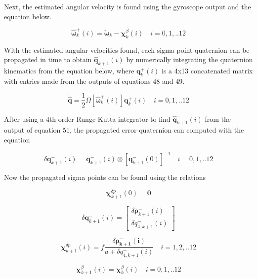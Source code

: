 \documentclass[12pt]{report}
\begin{document}
\noindent Next, the estimated angular velocity is found using the gyroscope output and the equation below.

\begin{equation}
	\pmb{\hat{\omega}}_k^+(i)  = \tilde{\pmb{\omega}}_k - \pmb{\chi}_k^{\beta}(i) \quad i = 0,1,..12
\end{equation} 

\noindent With the estimated angular velocities found, each sigma point quaternion can be propagated in time to obtain $\hat{\pmb{q}}_{k+1}^-(i)$ by numerically integrating the quaternion kinematics from the equation below, where $\pmb{q}_k^+(i)$ is a 4x13 concatenated matrix with entries made from the outputs of equations 48 and 49.

\begin{equation}
	\pmb{\dot{\hat{q}}} = \frac{1}{2}\Omega[\pmb{\hat{\omega}}_k^+(i)]\pmb{q}_k^+(i) \quad i = 0,1,..12
\end{equation} 

\noindent After using a 4th order Runge-Kutta integrator to find $\hat{\pmb{q}}_{k+1}^-(i)$ from the output of equation 51, the propagated error quaternion can computed with the equation 

\begin{equation}
	\delta\pmb{q}_{k+1}^-(i) = \pmb{q}_{k+1}^-(i) \otimes [\pmb{q}_{k+1}^-(0)]^{-1} \quad i = 0,1,..12
\end{equation} 

\noindent Now the propagated sigma points can be found using the relations

\begin{equation}
	 \pmb{\chi}_{k+1}^{\delta p}(0) = \pmb{0}
\end{equation}

\begin{equation}
	\delta\pmb{q}_{k+1}^-(i)  = \begin{bmatrix} 	\delta \pmb{\rho}_{k+1}^-(i) \\ 	\delta q_{4,k+1}^-(i)
	\end{bmatrix}
\end{equation} 

\begin{equation}
	\pmb{\chi}_{k+1}^{\delta p}(i) = f \frac{\delta\pmb{\rho_{k+1}^-(i)}}{a + \delta q_{4,k+1}^-(i)} \quad i = 1,2,..12
\end{equation}

\begin{equation}
	\pmb{\chi}_{k+1}^{\beta}(i) = \pmb{\chi}_{k}^{\beta}(i) \quad i = 0,1,..12
\end{equation}
\end{document}
